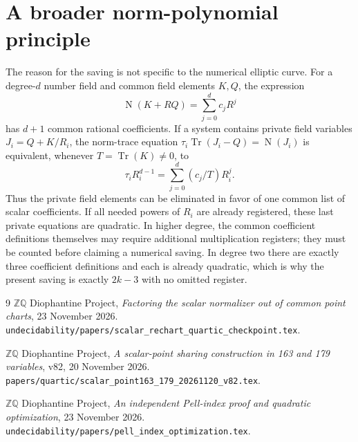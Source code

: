 \documentclass[11pt]{article}
\newcommand{\Tr}{\operatorname{Tr}}
\newcommand{\Nm}{\operatorname{N}}
\begin{document}
\section{A broader norm-polynomial principle}

The reason for the saving is not specific to the numerical
elliptic curve. For a degree-\(d\) number field and common field
elements \(K,Q\), the expression
\[
                      \Nm(K+RQ)=\sum_{j=0}^d c_jR^j
\]
has \(d+1\) common rational coefficients. If a system contains
private field variables \(J_i=Q+K/R_i\), the norm-trace equation
\(\tau_i\Tr(J_i-Q)=\Nm(J_i)\) is equivalent, whenever
\(T=\Tr(K)\ne0\), to
\[
                  \tau_i R_i^{d-1}
                        =\sum_{j=0}^d (c_j/T)R_i^j.
\]
Thus the private field elements can be eliminated in favor of
one common list of scalar coefficients. If all needed powers
of \(R_i\) are already registered, these last private equations
are quadratic. In higher degree, the common coefficient
definitions themselves may require additional multiplication
registers; they must be counted before claiming a numerical
saving. In degree two there are exactly three coefficient
definitions and each is already quadratic, which is why the
present saving is exactly \(2k-3\) with no omitted register.

\enlargethispage{\baselineskip}
\begin{thebibliography}{9}\small
{}
\(\mathbb Z\mathbb Q\) Diophantine Project,
\emph{Factoring the scalar normalizer out of common point charts},
23 November 2026.
\nolinkurl{undecidability/papers/scalar_rechart_quartic_checkpoint.tex}.

\(\mathbb Z\mathbb Q\) Diophantine Project,
\emph{A scalar-point sharing construction in 163 and 179 variables},
v82, 20 November 2026.
\nolinkurl{papers/quartic/scalar_point163_179_20261120_v82.tex}.

\(\mathbb Z\mathbb Q\) Diophantine Project,
\emph{An independent Pell-index proof and quadratic optimization},
23 November 2026.
\nolinkurl{undecidability/papers/pell_index_optimization.tex}.
\end{thebibliography}
\end{document}
